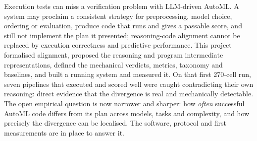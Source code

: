Execution tests can miss a verification problem with LLM-driven
AutoML. A system may proclaim a consistent strategy for
preprocessing, model choice, ordering or evaluation, produce code that
runs and gives a passable score, and still not implement the plan it
presented; reasoning-code alignment cannot be replaced by execution
correctness and predictive performance. This project formalised
alignment, proposed the reasoning and program intermediate
representations, defined the mechanical verdicts, metrics, taxonomy
and baselines, and built a running system and
measured it. On that first 270-cell run, seven pipelines that
executed and scored well were caught contradicting their own
reasoning: direct evidence that the divergence is real and
mechanically detectable. The open empirical question is now narrower
and sharper: how \emph{often} successful AutoML code differs from
its plan across models, tasks and complexity, and how precisely the
divergence can be localised. The software, protocol and first
measurements are in place to answer it.
